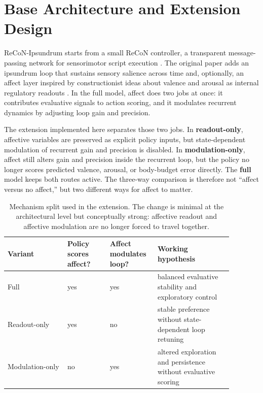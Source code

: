 \documentclass[letterpaper]{article}
\begin{document}
\section{Base Architecture and Extension Design}
ReCoN-Ipsundrum starts from a small ReCoN controller, a transparent message-passing network for sensorimotor script execution \citep{BachHerger2015ReCoN}. The original paper adds an ipsundrum loop that sustains sensory salience across time and, optionally, an affect layer inspired by constructionist ideas about valence and arousal as internal regulatory readouts \citep{Humphrey2023Sentience,Barrett2017HowEmotions,Sanyal2026ReCoNIpsundrum}. In the full model, affect does two jobs at once: it contributes evaluative signals to action scoring, and it modulates recurrent dynamics by adjusting loop gain and precision.

The extension implemented here separates those two jobs. In \textbf{readout-only}, affective variables are preserved as explicit policy inputs, but state-dependent modulation of recurrent gain and precision is disabled. In \textbf{modulation-only}, affect still alters gain and precision inside the recurrent loop, but the policy no longer scores predicted valence, arousal, or body-budget error directly. The \textbf{full} model keeps both routes active. The three-way comparison is therefore not ``affect versus no affect,'' but two different ways for affect to matter.

\begin{table}[t]
\centering
\small
\begin{tabular}{@{}p{0.24\linewidth}p{0.17\linewidth}p{0.17\linewidth}p{0.30\linewidth}@{}}
\toprule
Variant & \shortstack{Policy\\scores\\affect?} & \shortstack{Affect\\modulates\\loop?} & Working hypothesis \\
\midrule
Full & yes & yes & balanced evaluative stability and exploratory control \\
Readout-only & yes & no & stable preference without state-dependent loop retuning \\
Modulation-only & no & yes & altered exploration and persistence without evaluative scoring \\
\bottomrule
\end{tabular}
\caption{Mechanism split used in the extension. The change is minimal at the architectural level but conceptually strong: affective readout and affective modulation are no longer forced to travel together.}
\label{tab:variants}
\end{table}
\end{document}
